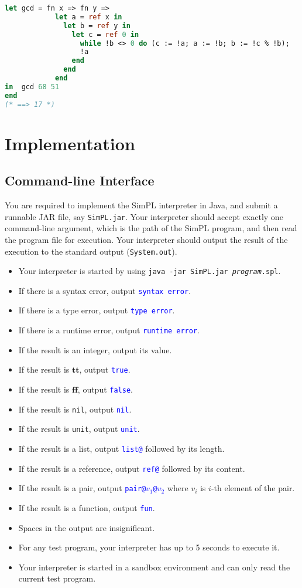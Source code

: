 \documentclass{article}
\newcommand{\btt}{\mathbf{tt}}
\newcommand{\bff}{\mathbf{ff}}
\newcommand{\result}[1]{\textcolor{blue}{\texttt{#1}}}
\begin{document}
\begin{lstlisting}[language=ML]
let gcd = fn x => fn y =>
            let a = ref x in
              let b = ref y in
                let c = ref 0 in
                  while !b <> 0 do (c := !a; a := !b; b := !c % !b);
                  !a
                end
              end
            end
in  gcd 68 51
end
(* ==> 17 *)
\end{lstlisting}

\section{Implementation}

\subsection{Command-line Interface}

You are required to implement the SimPL interpreter in Java, and submit a runnable JAR file, say \texttt{SimPL.jar}.  Your interpreter should accept exactly one command-line argument, which is the path of the SimPL program, and then read the program file for execution.  Your interpreter should output the result of the execution to the standard output (\texttt{System.out}).
\begin{itemize}
  \item Your interpreter is started by using \texttt{java -jar SimPL.jar \emph{program}.spl}.
  \item If there is a syntax error, output \result{syntax error}.
  \item If there is a type error, output \result{type error}.
  \item If there is a runtime error, output \result{runtime error}.
  \item If the result is an integer, output its value.
  \item If the result is $\btt$, output \result{true}.
  \item If the result is $\bff$, output \result{false}.
  \item If the result is \texttt{nil}, output \result{nil}.
  \item If the result is \texttt{unit}, output \result{unit}.
  \item If the result is a list, output \result{list@} followed by its length.
  \item If the result is a reference, output \result{ref@} followed by its content.
  \item If the result is a pair, output \result{pair@$v_1$@$v_2$} where $v_i$ is $i$-th element of the pair.
  \item If the result is a function, output \result{fun}.
  \item Spaces in the output are insignificant.
  \item For any test program, your interpreter has up to 5 seconds to execute it.
  \item Your interpreter is started in a sandbox environment and can only read the current test program.
\end{itemize}
\end{document}
